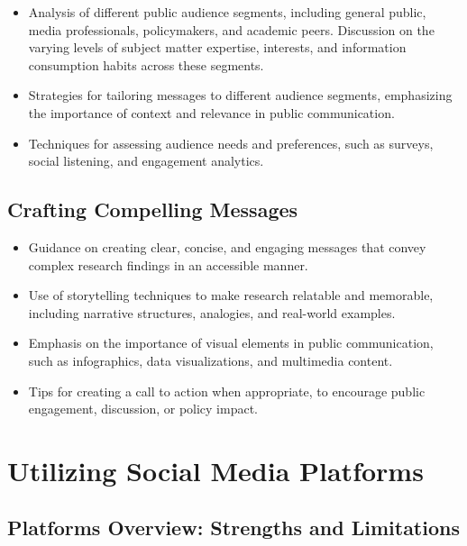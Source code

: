 \documentclass[
]{book}
\begin{document}
\begin{itemize}
\item
  Analysis of different public audience segments, including general public, media professionals, policymakers, and academic peers. Discussion on the varying levels of subject matter expertise, interests, and information consumption habits across these segments.
\item
  Strategies for tailoring messages to different audience segments, emphasizing the importance of context and relevance in public communication.
\item
  Techniques for assessing audience needs and preferences, such as surveys, social listening, and engagement analytics.
\end{itemize}

\hypertarget{crafting-compelling-messages}{%
\subsection*{Crafting Compelling Messages}\label{crafting-compelling-messages}}

\begin{itemize}
\item
  Guidance on creating clear, concise, and engaging messages that convey complex research findings in an accessible manner.
\item
  Use of storytelling techniques to make research relatable and memorable, including narrative structures, analogies, and real-world examples.
\item
  Emphasis on the importance of visual elements in public communication, such as infographics, data visualizations, and multimedia content.
\item
  Tips for creating a call to action when appropriate, to encourage public engagement, discussion, or policy impact.
\end{itemize}

\hypertarget{utilizing-social-media-platforms}{%
\section*{Utilizing Social Media Platforms}\label{utilizing-social-media-platforms}}

\hypertarget{platforms-overview-strengths-and-limitations}{%
\subsection*{Platforms Overview: Strengths and Limitations}\label{platforms-overview-strengths-and-limitations}}
\end{document}
